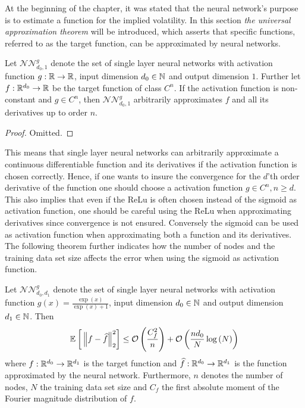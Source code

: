 At the beginning of the chapter, it was stated that the neural network's purpose is to estimate a function for the implied volatility. In this section \emph{the universal approximation theorem} will be introduced, which asserts that specific functions, 
referred to as the target function, can be approximated by neural networks.
\begin{thm} \label{Thm:UAT}
    Let $\mathcal{NN}_{d_0, 1}^g$ denote the set of single layer neural networks with activation function $g: \mathbb{R} \to \mathbb{R}$, input dimension $d_0 \in \mathbb{N}$ and output dimension $1$. Further let $f: \mathbb{R}^{d_0} \to \mathbb{R}$ be the target function of class $C^n$. If the activation function is non-constant and $g \in C^n$, then $\mathcal{NN}_{d_0, 1}^g$ arbitrarily approximates $f$ and all its derivatives up to order $n$.
\end{thm} 
\begin{proof}
    Omitted.
\end{proof}

This means that single layer neural networks can arbitrarily approximate a continuous differentiable function and its derivatives if the activation function is chosen correctly. Hence, if one wants to insure the convergence for the $d$'th order derivative of the function one should choose a activation function $g \in C^n, n \geq d$. This also implies that even if the ReLu is often chosen instead of the sigmoid as activation function, one should be careful using the ReLu when approximating derivatives since convergence is not ensured. Conversely the sigmoid can be used as activation function when approximating both a function and its derivatives. The following theorem further indicates how the number of nodes and the training data set size affects the error when using the sigmoid as activation function.
\begin{thm}\label{Thm:estimation_bounds}
    Let $\mathcal{NN}_{d_0, d_1}^g$ denote the set of single layer neural networks with activation function $g(x) = \frac{\exp{(x)}}{\exp{(x)}+1}$, input dimension $d_0 \in \mathbb{N}$ and output dimension $d_1 \in \mathbb{N}$. Then
    \begin{align}\label{Eq:Estimation_bounds}
        \E{\norm{f-\hat{f}}_2^2} \leq \mathcal{O}\left(\frac{C_f^2}{n} \right) + \mathcal{O}\left(\frac{nd_0}{N} \log{(N)} \right) 
    \end{align}
    where $f: \mathbb{R}^{d_0} \to \mathbb{R}^{d_1}$ is the target function and $\widehat{f}: \mathbb{R}^{d_0} \to \mathbb{R}^{d_1}$ is the function approximated by the neural network. Furthermore, $n$ denotes the number of nodes, $N$ the training data set size and $C_f$ the first absolute moment of the Fourier magnitude distribution of $f$.
\end{thm}


